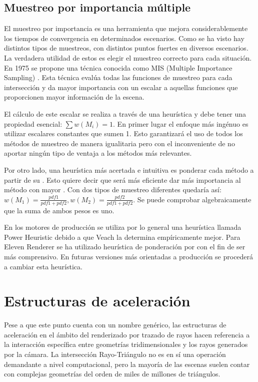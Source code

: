 \subsection{Muestreo por importancia múltiple}

El muestreo por importancia es una herramienta que mejora considerablemente los tiempos de convergencia en determinados escenarios. Como se ha visto hay distintos tipos de muestreos, con distintos puntos fuertes en diversos escenarios. La verdadera utilidad de estos es elegir el muestreo correcto para cada situación. En 1975 se propone una técnica conocida como MIS (Multiple Importance Sampling) \cite{veach1995optimally}. Esta técnica evalúa todas las funciones de muestreo para cada intersección y da mayor importancia con un escalar a aquellas funciones que proporcionen mayor información de la escena.

El cálculo de este escalar se realiza a través de una heurística y debe tener una propiedad esencial: $\sum{w(M_i)} = 1$. En primer lugar el enfoque más ingénuo es utilizar escalares constantes que sumen 1. Esto garantizará el uso de todos los métodos de muestreo de manera igualitaria pero con el inconveniente de no aportar ningún tipo de ventaja a los métodos más relevantes. 

Por otro lado, una heurística más acertada e intuitiva es ponderar cada método a partir de su . Esto quiere decir que será más eficiente dar más importancia al método con mayor . Con dos tipos de muestreo diferentes  quedaría así: $w(M_1) = \frac{pdf1}{pdf1 + pdf2}, w(M_2) = \frac{pdf2}{pdf1 + pdf2}$. Se puede comprobar algebraicamente que la suma de ambos pesos es uno.


En los motores de producción se utiliza por lo general una heurística llamada Power Heuristic debido a que Veach \cite{veach1995optimally} la determina empíricamente mejor. Para Eleven Renderer se ha utilizado heurística de ponderación por  con el fin de ser más comprensivo. En futuras versiones más orientadas a producción se procederá a cambiar esta heurística.

\section{Estructuras de aceleración}
\label{BVH}
	
Pese a que este punto cuenta con un nombre genérico, las estructuras de aceleración en el ámbito del renderizado por trazado de rayos hacen referencia a la interacción específica entre geometrías tridimensionales y los rayos generados por la cámara. La intersección Rayo-Triángulo no es en sí una operación demandante a nivel computacional, pero la mayoría de las escenas suelen contar con complejas geometrías del orden de miles de millones de triángulos.

